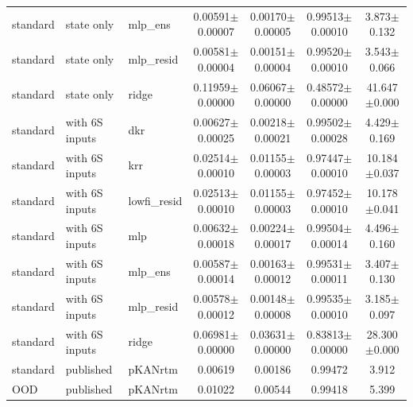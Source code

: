 \begin{tabular}{lllcccc}
standard & state only & mlp\_ens & 0.00591$\pm$0.00007 & 0.00170$\pm$0.00005 & 0.99513$\pm$0.00010 & 3.873$\pm$0.132 \\
standard & state only & mlp\_resid & 0.00581$\pm$0.00004 & 0.00151$\pm$0.00004 & 0.99520$\pm$0.00010 & 3.543$\pm$0.066 \\
standard & state only & ridge & 0.11959$\pm$0.00000 & 0.06067$\pm$0.00000 & 0.48572$\pm$0.00000 & 41.647$\pm$0.000 \\
standard & with 6S inputs & dkr & 0.00627$\pm$0.00025 & 0.00218$\pm$0.00021 & 0.99502$\pm$0.00028 & 4.429$\pm$0.169 \\
standard & with 6S inputs & krr & 0.02514$\pm$0.00010 & 0.01155$\pm$0.00003 & 0.97447$\pm$0.00010 & 10.184$\pm$0.037 \\
standard & with 6S inputs & lowfi\_resid & 0.02513$\pm$0.00010 & 0.01155$\pm$0.00003 & 0.97452$\pm$0.00010 & 10.178$\pm$0.041 \\
standard & with 6S inputs & mlp & 0.00632$\pm$0.00018 & 0.00224$\pm$0.00017 & 0.99504$\pm$0.00014 & 4.496$\pm$0.160 \\
standard & with 6S inputs & mlp\_ens & 0.00587$\pm$0.00014 & 0.00163$\pm$0.00012 & 0.99531$\pm$0.00011 & 3.407$\pm$0.130 \\
standard & with 6S inputs & mlp\_resid & 0.00578$\pm$0.00012 & 0.00148$\pm$0.00008 & 0.99535$\pm$0.00010 & 3.185$\pm$0.097 \\
standard & with 6S inputs & ridge & 0.06981$\pm$0.00000 & 0.03631$\pm$0.00000 & 0.83813$\pm$0.00000 & 28.300$\pm$0.000 \\
standard & published & pKANrtm & 0.00619 & 0.00186 & 0.99472 & 3.912 \\
OOD & published & pKANrtm & 0.01022 & 0.00544 & 0.99418 & 5.399 \\
\bottomrule
\end{tabular}
